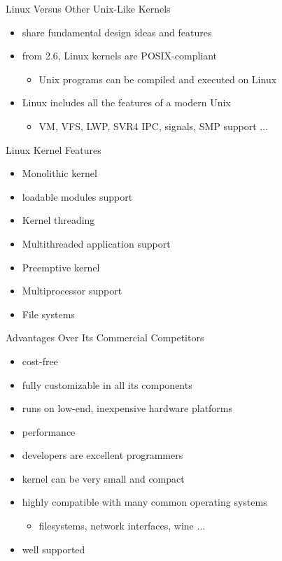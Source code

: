 \begin{frame}%
  \begin{exampleblock}{Linux Versus Other Unix-Like Kernels}
    \begin{itemize}
    \item share fundamental design ideas and features
    \item from 2.6, Linux kernels are POSIX-compliant
      \begin{itemize}
      \item Unix programs can be compiled and executed on Linux
      \end{itemize}
    \item Linux includes all the features of a modern Unix
      \begin{itemize}
      \item VM, VFS, LWP, SVR4 IPC, signals, SMP support ...
      \end{itemize}
    \end{itemize}
  \end{exampleblock}
\end{frame}

\begin{frame}
  \begin{exampleblock}{Linux Kernel Features}
    \begin{itemize}
    \item Monolithic kernel
    \item loadable modules support
    \item Kernel threading
    \item Multithreaded application support
    \item Preemptive kernel
    \item Multiprocessor support
    \item File systems
    \end{itemize}
  \end{exampleblock}
\end{frame}

\begin{frame}
  \begin{exampleblock}{Advantages Over Its Commercial Competitors}
    \begin{itemize}
    \item cost-free
    \item fully customizable in all its components
    \item runs on low-end, inexpensive hardware platforms
    \item performance
    \item developers are excellent programmers
    \item kernel can be very small and compact
    \item highly compatible with many common operating systems
      \begin{itemize}
      \item filesystems, network interfaces, wine ...
      \end{itemize}
    \item well supported
    \end{itemize}
  \end{exampleblock}
\end{frame}

